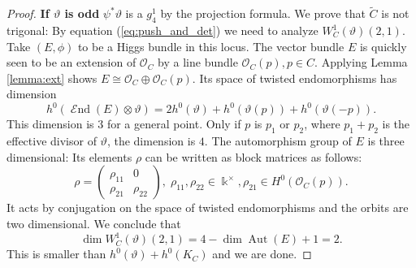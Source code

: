 \documentclass[12pt]{extarticle}
\theoremstyle{definition}
\numberwithin{theorem}{section}
\newcommand{\OO}{\mathcal{O}}
\newcommand{\op}{\operatorname}
\DeclareMathOperator{\End}{\mathcal{E}nd}
\renewcommand{\tilde}{\widetilde}		%
\begin{document}
\begin{proof}
\textbf{If $\vartheta$ is odd} $\psi^*\vartheta$ is a $g^1_4$ by the projection formula. We prove that $\tilde{C}$ is not trigonal: By equation (\ref{eq:push_and_det}) we need to analyze $W^1_C(\vartheta)(2,1)$. Take $(E,\phi)$ to be a Higgs bundle in this locus. The vector bundle $E$ is quickly seen to be an extension of $\OO_C$ by a line bundle $\OO_C(p), p \in C$.  Applying Lemma \ref{lemma:ext} shows $E \cong \OO_C \oplus \OO_C(p)$. Its space of twisted endomorphisms has dimension
\begin{equation*}
h^0(\End(E)\otimes \vartheta) =  2h^0(\vartheta) + h^0(\vartheta(p)) + h^0(\vartheta(-p)). 
\end{equation*}
This dimension is $3$ for a general point. Only if $p$ is  $p_1$ or $p_2$, where $p_1 + p_2$ is the effective divisor of $\vartheta$, the dimension is $4$.  The automorphism group of $E$ is three dimensional: Its elements $\rho$ can be written as block matrices as follows: 
\begin{equation}
\rho = \begin{pmatrix}
\rho_{11} & 0 \\
\rho_{21} & \rho_{22}
\end{pmatrix}, \;\rho_{11},\rho_{22} \in \Bbbk^\times, \rho_{21} \in H^0(\OO_C(p)). 
\end{equation}
It acts by conjugation on the space of twisted endomorphisms and the orbits are two dimensional.  We conclude that 
\begin{equation}
\dim W^1_C(\vartheta)(2,1) = 4 - \dim \op{Aut}(E) + 1 = 2.
\end{equation}
This is smaller than $h^0(\vartheta) + h^0(K_C)$ and we are done.
\end{proof}
\end{document}
